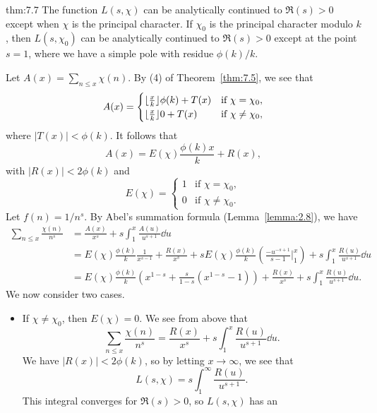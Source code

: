 \begin{theo}{thm:7.7}
    The function $L(s, \chi)$ can be analytically continued to $\Re(s) > 0$ except 
    when $\chi$ is the principal character. If $\chi_0$ is the principal character 
    modulo $k$, then $L(s, \chi_0)$ can be analytically continued to $\Re(s) > 0$ 
    except at the point $s = 1$, where we have a simple pole with residue $\phi(k)/k$.  
\end{theo}
\begin{pf}
    Let $A(x) = \sum_{n\leq x} \chi(n)$. By (4) of Theorem~\ref{thm:7.5}, we see that 
    \[ A(x) = \begin{cases}
        \lfloor\frac{x}{k}\rfloor \phi(k) + T(x) & \text{if } \chi = \chi_0, \\ 
        \lfloor\frac{x}{k}\rfloor 0 + T(x) & \text{if } \chi \neq \chi_0,
    \end{cases} \]
    where $|T(x)| < \phi(k)$. It follows that 
    \[ A(x) = E(\chi) \frac{\phi(k)x}{k} + R(x), \] 
    with $|R(x)| < 2\phi(k)$ and 
    \[ E(\chi) = \begin{cases}
        1 & \text{if } \chi = \chi_0, \\ 
        0 & \text{if } \chi \neq \chi_0.
    \end{cases} \]
    Let $f(n) = 1/n^s$. By Abel's summation formula (Lemma~\ref{lemma:2.8}), we have 
    \begin{align*}
        \sum_{n\leq x} \frac{\chi(n)}{n^s} 
        &= \frac{A(x)}{x^s} + s \int_1^x \frac{A(u)}{u^{s+1}}\dd u \\ 
        &= E(\chi) \frac{\phi(k)}{k} \frac{1}{x^{s-1}} + \frac{R(x)}{x^s} 
        + sE(\chi) \frac{\phi(k)}{k} \left( \frac{-u^{-s+1}}{s-1} \bigg|_1^x \right)
        + s \int_1^x \frac{R(u)}{u^{s+1}}\dd u \\ 
        &= E(\chi) \frac{\phi(k)}{k} \left( x^{1-s} + \frac{s}{1-s} (x^{1-s} - 1) 
        \right) + \frac{R(x)}{x^s} + s \int_1^x \frac{R(u)}{u^{s+1}}\dd u.  
    \end{align*}
    We now consider two cases. 
    \begin{itemize}
        \item If $\chi \neq \chi_0$, then $E(\chi) = 0$. We see from above that 
        \[ \sum_{n\leq x} \frac{\chi(n)}{n^s} = \frac{R(x)}{x^s} + s \int_1^x 
        \frac{R(u)}{u^{s+1}}\dd u. \] 
        We have $|R(x)| < 2\phi(k)$, so by letting $x \to \infty$, we see that 
        \[ L(s, \chi) = s \int_1^\infty \frac{R(u)}{u^{s+1}}. \] 
        This integral converges for $\Re(s) > 0$, so $L(s, \chi)$ has an 

\end{itemize}
\end{pf}
